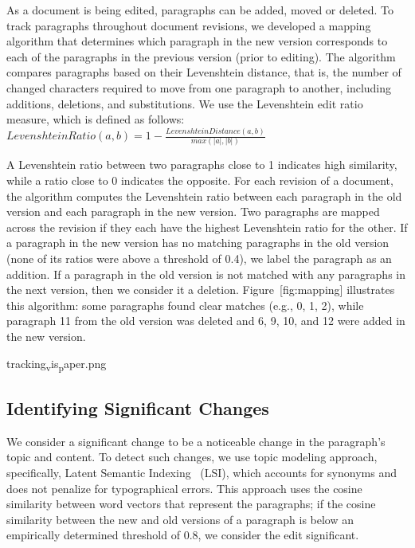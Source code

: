 As a document is being edited, paragraphs can be added, moved or
deleted. To track paragraphs throughout document revisions, we developed
a mapping algorithm that determines which paragraph in the new version
corresponds to each of the paragraphs in the previous version (prior to
editing). The algorithm compares paragraphs based on their Levenshtein
distance, that is, the number of changed characters required to move
from one paragraph to another, including additions, deletions, and
substitutions. We use the Levenshtein edit ratio measure, which is
defined as follows:
\(Levenshtein Ratio(a,b) = 1-\frac{Levenshtein Distance(a,b)}{max(|a|,|b|)} \)

A Levenshtein ratio between two paragraphs close to 1 indicates high
similarity, while a ratio close to 0 indicates the opposite. For each
revision of a document, the algorithm computes the Levenshtein ratio
between each paragraph in the old version and each paragraph in the new
version. Two paragraphs are mapped across the revision if they each have
the highest Levenshtein ratio for the other. If a paragraph in the new
version has no matching paragraphs in the old version (none of its
ratios were above a threshold of 0.4), we label the paragraph as an
addition. If a paragraph in the old version is not matched with any
paragraphs in the next version, then we consider it a deletion.
Figure~{[}fig:mapping{]} illustrates this algorithm: some paragraphs
found clear matches (e.g., 0, 1, 2), while paragraph 11 from the old
version was deleted and 6, 9, 10, and 12 were added in the new version.

tracking\textsubscript{v}is\textsubscript{p}aper.png

\subsection{Identifying Significant
Changes}\label{identifying-significant-changes}

We consider a significant change to be a noticeable change in the
paragraph's topic and content. To detect such changes, we use topic
modeling approach, specifically, Latent Semantic
Indexing~\cite{deerwester1990indexing} (LSI), which accounts for
synonyms and does not penalize for typographical errors. This approach
uses the cosine similarity between word vectors that represent the
paragraphs; if the cosine similarity between the new and old versions of
a paragraph is below an empirically determined threshold of 0.8, we
consider the edit significant.


